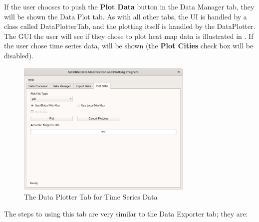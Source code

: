 \documentclass[../00_main.tex]{subfiles}
\begin{document}
If the user chooses to push the \textbf{Plot Data} button in the Data Manager
tab, they will be shown the Data Plot tab. As with all other tabs, the UI is
handled by a class called DataPlotterTab, and the plotting itself is handled by 
the DataPlotter. The GUI the user will see if they chose to plot heat map data 
is illustrated in . If the user chose time series data, 
 will be shown (the \textbf{Plot Cities} check box will be 
disabled). 
\begin{figure}[H]
    \center
    \includegraphics[width=0.75\textwidth]{../graphics/dpl02}
    \caption{The Data Plotter Tab for Time Series Data}
    \label{dpl02}
\end{figure}
The steps to using this tab are very similar to the Data
Exporter tab; they are:
\end{document}
